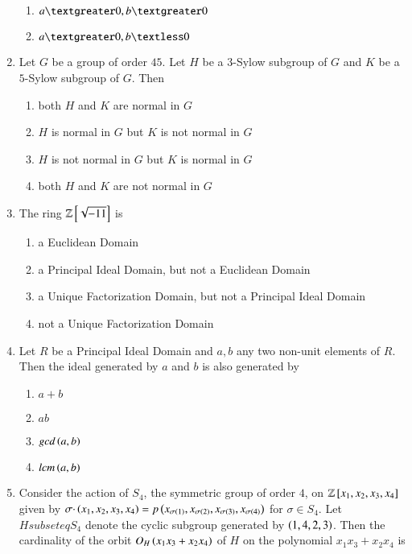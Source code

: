 \documentclass[journal]{IEEEtran}
\begin{document}
\begin{enumerate}
{\begin{multicols}{4}
\begin{enumerate}
\item $a\textgreater0,b\textgreater0$
\item $a\textgreater0,b\textless0$
\end{enumerate}
\end{multicols}
}
\item{
Let $G$ be a group of order $45$. Let $H$ be a $3$-Sylow subgroup of $G$ and $K$ be a $5$-Sylow subgroup of $G$. Then
\begin{multicols}{2}
\begin{enumerate}
\item both $H$ and $K$ are normal in $G$ 
\item $H$ is normal in $G$ but $K$ is not normal in $G$
\item $H$ is not normal in $G$ but $K$ is normal in $G$
\item both $H$ and $K$ are not normal in $G$
\end{enumerate}
\end{multicols}
}
\item{
The ring $\mathbb{Z}{}\left[\sqrt{-11}\right]$ is 
\begin{multicols}{2}
\begin{enumerate}
\item a Euclidean Domain
\item a Principal Ideal Domain, but not a Euclidean Domain
\item a Unique Factorization Domain, but not a Principal Ideal Domain
\item not a Unique Factorization Domain
\end{enumerate}
\end{multicols}
}
\item{
Let $R$ be a Principal Ideal Domain and $a,b$ any two non-unit elements of $R$. Then the ideal generated by $a$ and $b$ is also generated by
\begin{multicols}{4}
\begin{enumerate}
\item $a+b$
\item $ab$
\item $gcd\left(a,b\right)$
\item $lcm\left(a,b\right)$
\end{enumerate}
\end{multicols}
}
\item{
Consider the action of $S_4$, the symmetric group of order $4$, on $\mathbb{Z}{}\left[x_1,x_2,x_3,x_4\right]$ given by $\sigma\cdotp\left(x_1,x_2,x_3,x_4\right)=p\left(x_{\sigma\left(1\right)},x_{\sigma\left(2\right)},x_{\sigma\left(3\right)},x_{\sigma\left(4\right)}\right)$ for $\sigma\in S_4$. Let $Hsubseteq S_4$ denote the cyclic subgroup generated by $\left(1,4,2,3\right)$. Then the cardinality of the orbit $O_H\left(x_1x_3+x_2x_4\right)$ of $H$ on the polynomial $x_1x_3+x_2x_4$ is
}
\end{enumerate}
\end{document}
